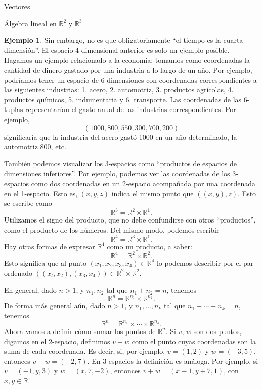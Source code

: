 \documentclass[a4paper,12pt,twoside,spanish]{amsbook}
\theoremstyle{definition}
\newtheorem{ejemplo}{Ejemplo}[section]
\theoremstyle{remark}
\newcommand{\R}{\mathbb R}
\begin{document}
\begin{chapter}{Vectores}
\begin{section}{Álgebra lineal en $\R^2$ y $\R^3$}
\begin{ejemplo}
			Sin embargo, no es que obligatoriamente ``el tiempo es la cuarta dimensión''. El espacio 4-dimensional anterior es solo un ejemplo posible. Hagamos un ejemplo relacionado a la economía: tomamos como coordenadas la cantidad de dinero gastado por una industria a lo largo de un año. 
			Por ejemplo, podríamos tener un espacio de 6 dimensiones con coordenadas correspondientes a las siguientes industrias: 1. acero, 2. automotriz, 3. productos agrícolas,  4. productos químicos, 5. indumentaria y 6. transporte. Las coordenadas de las 6-tuplas representarían el gasto anual de las industrias correspondientes. Por  ejemplo, 
			\begin{equation*}
			(1000, 800, 550, 300, 700, 200)
			\end{equation*}
			significaría que la industria del acero gastó 1000 en un año determinado, la automotriz 800, etc.
		\end{ejemplo} 

		También podemos visualizar los 3-espacios  como ``productos de espacios de dimensiones inferiores''. Por ejemplo, podemos ver las coordenadas de los 3-espacios como dos coordenadas en un 2-espacio acompañada por una coordenada en el 1-espacio. Esto es, $(x,y,z)$ indica el mismo punto que $((x,y),z)$.  Esto se escribe como 
		\begin{equation*}
			\R^3 = \R^2 \times \R^1.
		\end{equation*}
		Utilizamos el signo del producto, que no debe confundirse con otros ``productos'', como el producto de los números. Del mismo modo, podemos escribir
		\begin{equation*}
		\R^4 = \R^3 \times \R^1.
		\end{equation*}
		Hay otras formas de expresar $\R^4$ como un producto, a saber:
		\begin{equation*}
		\R^4 = \R^2 \times \R^2.
		\end{equation*}
		Esto significa que al punto $(x_1,x_2,x_3,x_4)\in \R^4$  lo podemos describir por el par ordenado $((x_l, x_2),(x_3, x_4))\in \R^2 \times \R^2$. 
		
		En  general, dado $n>1$, y $n_1,n_2$ tal que $n_1+n_2 = n$, tenemos
		\begin{equation*}
		\R^n= \R^{n_1} \times \R^{n_2}.
		\end{equation*} 
		De forma más general aún,  dado $n>1$, y $n_1,\ldots,n_k$ tal que $n_1+\cdots+n_k = n$, tenemos
		\begin{equation*}
		\R^n= \R^{n_1} \times \cdots\times \R^{n_k}.
		\end{equation*} 	
		Ahora vamos a definir cómo sumar los puntos de $\R^n$. Si $v$, $w$ son dos puntos, digamos en el 2-espacio,  definimos $v + w$ como el punto cuyas coordenadas son la suma de cada coordenada. Es decir, si, por ejemplo,  $v= (1, 2)$ y $w= (- 3, 5)$, entonces $v+w = (- 2, 7)$. En 3-espacios la definición es análoga. Por  ejemplo, si $v= (- 1, y, 3)$ y $w= (x, 7, - 2)$, entonces $v+w = (x - 1, y + 7, 1)$, con $x,y \in \R$.
		

\end{section}
\end{chapter}
\end{document}
